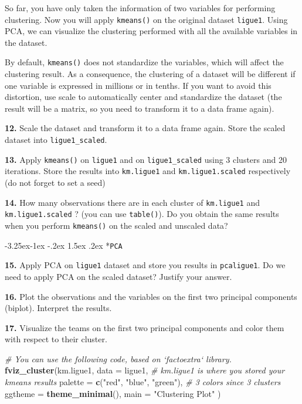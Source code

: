 \documentclass[]{book}
\makeatletter
\newenvironment{Shaded}{\begin{snugshade}}{\end{snugshade}}
\newcommand{\KeywordTok}[1]{\textcolor[rgb]{0.13,0.29,0.53}{\textbf{#1}}}
\newcommand{\DataTypeTok}[1]{\textcolor[rgb]{0.13,0.29,0.53}{#1}}
\newcommand{\StringTok}[1]{\textcolor[rgb]{0.31,0.60,0.02}{#1}}
\newcommand{\CommentTok}[1]{\textcolor[rgb]{0.56,0.35,0.01}{\textit{#1}}}
\newcommand{\NormalTok}[1]{#1}
\renewcommand\subsection{\@startsection{subsection}{2}{\z@}%
                                     {-3.25ex\@plus -1ex \@minus -.2ex}%
                                     {1.5ex \@plus .2ex}%
                                     {\normalfont\large\bfseries\color{Violet}}}
\theoremstyle{definition}
\theoremstyle{definition}
\theoremstyle{definition}
\theoremstyle{remark}
\makeatother
\begin{document}
So far, you have only taken the information of two variables for
performing clustering. Now you will apply \texttt{kmeans()} on the
original dataset \texttt{ligue1}. Using PCA, we can visualize the
clustering performed with all the available variables in the dataset.

By default, \texttt{kmeans()} does not standardize the variables, which
will affect the clustering result. As a consequence, the clustering of a
dataset will be different if one variable is expressed in millions or in
tenths. If you want to avoid this distortion, use scale to automatically
center and standardize the dataset (the result will be a matrix, so you
need to transform it to a data frame again).

\textbf{12.} Scale the dataset and transform it to a data frame again.
Store the scaled dataset into \texttt{ligue1\_scaled}.

\textbf{13.} Apply \texttt{kmeans()} on \texttt{ligue1} and on
\texttt{ligue1\_scaled} using 3 clusters and 20 iterations. Store the
results into \texttt{km.ligue1} and \texttt{km.ligue1.scaled}
respectively (do not forget to set a seed)

\textbf{14.} How many observations there are in each cluster of
\texttt{km.ligue1} and \texttt{km.ligue1.scaled} ? (you can use
\texttt{table()}). Do you obtain the same results when you perform
\texttt{kmeans()} on the scaled and unscaled data?

\subsection*{\texorpdfstring{\texttt{PCA}}{PCA}}\label{pca}

\textbf{15.} Apply PCA on \texttt{ligue1} dataset and store you results
in \texttt{pcaligue1}. Do we need to apply PCA on the scaled dataset?
Justify your answer.

\textbf{16.} Plot the observations and the variables on the first two
principal components (biplot). Interpret the results.

\textbf{17.} Visualize the teams on the first two principal components
and color them with respect to their cluster.

\begin{Shaded}
\begin{Highlighting}[]
\CommentTok{# You can use the following code, based on `factoextra` library.}
\KeywordTok{fviz_cluster}\NormalTok{(km.ligue1, }\DataTypeTok{data =}\NormalTok{ ligue1, }\CommentTok{# km.ligue1 is where you stored your kmeans results}
              \DataTypeTok{palette =} \KeywordTok{c}\NormalTok{(}\StringTok{"red"}\NormalTok{, }\StringTok{"blue"}\NormalTok{, }\StringTok{"green"}\NormalTok{), }\CommentTok{# 3 colors since 3 clusters}
              \DataTypeTok{ggtheme =} \KeywordTok{theme_minimal}\NormalTok{(),}
              \DataTypeTok{main =} \StringTok{"Clustering Plot"}
\NormalTok{)}
\end{Highlighting}
\end{Shaded}
\end{document}
